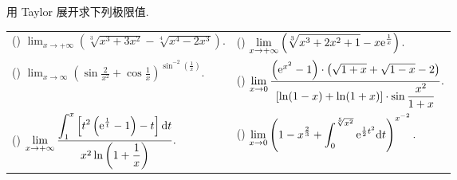 \begin{example}
    用 Taylor 展开求下列极限值.
    \setcounter{magicrownumbers}{0}
    \begin{table}[H]
        \centering
        \begin{tabular}{l | l}
            (\rownumber{}) $\displaystyle\lim_{x\to+\infty}\left(\sqrt[3]{x^3+3x^2}-\sqrt[4]{x^4-2x^3}\right).$                                                                         & (\rownumber{}) $\displaystyle\lim_{x\to+\infty}\left(\sqrt[3]{x^3+2x^2+1}-x\mathrm{e} ^{\frac{1}{x}}\right).$                                                             \\
            (\rownumber{}) $\displaystyle\lim_{x\to\infty}\left(\sin\frac{2}{x^2}+\cos\frac{1}{x}\right)^{\sin^{-2}\left(\frac{1}{x}\right)}.$                                          & (\rownumber{}) $\displaystyle\lim_{x\to0}\frac{\left(\mathrm{e} ^{x^2}-1\right)\cdot\left(\sqrt{1+x}+\sqrt{1-x}-2\right)}{[\ln(1-x)+\ln(1+x)]\cdot\sin\dfrac{x^2}{1+x}}.$ \\
            (\rownumber{}) $\displaystyle\lim_{x\to+\infty}\frac{\displaystyle\int_{1}^{x}\left[t^2\left(\mathrm{e} ^{\frac{1}{t}}-1\right)-t\right]\dd t}{x^2\ln\left(1+\dfrac{1}{x}\right)}.$ & (\rownumber{}) $\displaystyle\lim _{x\rightarrow 0}\left( 1-x^{\frac{2}{3}}+\int _{0}^{\sqrt[5] {x^{2}}}\mathrm{e} ^{\frac{1}{2}t^{2}}\dd t\right) ^{x^{-2}}.$
        \end{tabular}
    \end{table}
\end{example}
